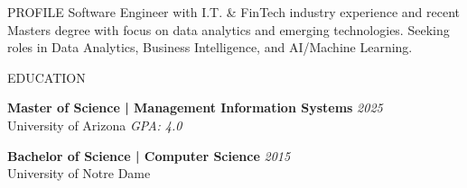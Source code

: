 \documentclass{resume} %
\begin{document}

\begin{rSection}{PROFILE}
\vspace{-6pt}
Software Engineer with I.T. \& FinTech industry experience and recent Masters degree with focus on data analytics and emerging technologies. Seeking roles in Data Analytics, Business Intelligence, and AI/Machine Learning.
\vspace{-6pt}
\end{rSection}

\begin{rSection}{EDUCATION}

\vspace{-6pt}
{\bf Master of Science | Management Information Systems} \hfill {\em 2025} \\
University of Arizona \hfill {\em GPA: 4.0}

\vspace{-6pt}
{\bf Bachelor of Science | Computer Science} \hfill {\em 2015} \\
University of Notre Dame

\vspace{-6pt}
\end{rSection}
\end{document}
